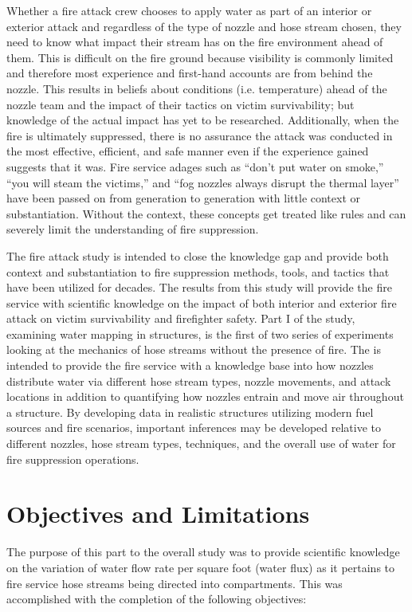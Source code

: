 \documentclass[12pt,oneside]{book}
\begin{document}
Whether a fire attack crew chooses to apply water as part of an interior or exterior attack and regardless of the type of nozzle and hose stream chosen, they need to know what impact their stream has on the fire environment ahead of them. This is difficult on the fire ground because visibility is commonly limited and therefore most experience and first-hand accounts are from behind the nozzle. This results in beliefs about conditions (i.e. temperature) ahead of the nozzle team and the impact of their tactics on victim survivability; but knowledge of the actual impact has yet to be researched. Additionally, when the fire is ultimately suppressed, there is no assurance the attack was conducted in the most effective, efficient, and safe manner even if the experience gained suggests that it was. Fire service adages such as ``don't put water on smoke,'' ``you will steam the victims,'' and ``fog nozzles always disrupt the thermal layer'' have been passed on from generation to generation with little context or substantiation. Without the context, these concepts get treated like rules and can severely limit the understanding of fire suppression.

The fire attack study is intended to close the knowledge gap and provide both context and substantiation to fire suppression methods, tools, and tactics that have been utilized for decades. The results from this study will provide the fire service with scientific knowledge on the impact of both interior and exterior fire attack on victim survivability and firefighter safety. Part I of the study, examining water mapping in structures, is the first of two series of experiments looking at the mechanics of hose streams without the presence of fire. The is intended to provide the fire service with a knowledge base into how nozzles distribute water via different hose stream types, nozzle movements, and attack locations in addition to quantifying how nozzles entrain and move air throughout a structure. By developing data in realistic structures utilizing modern fuel sources and fire scenarios, important inferences may be developed relative to different nozzles, hose stream types, techniques, and the overall use of water for fire suppression operations.

\chapter{Objectives and Limitations}

The purpose of this part to the overall study was to provide scientific knowledge on the variation of water flow rate per square foot (water flux) as it pertains to fire service hose streams being directed into compartments. This was accomplished with the completion of the following objectives:
\end{document}
